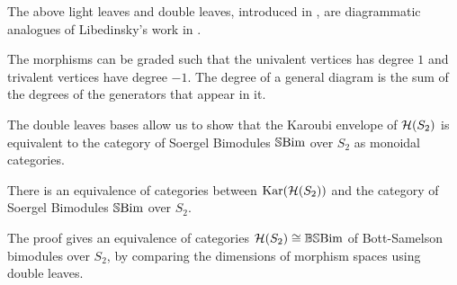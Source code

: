\begin{remark}
    The above light leaves and double leaves, introduced in \cite{elias-williamson-soergel-calculus}, are diagrammatic analogues of Libedinsky's work in \cite{libedinsky-lightleavesbasis}.
\end{remark}

The morphisms can be graded such that the univalent vertices has degree $1$ and trivalent vertices have degree $-1$. The degree of a general diagram is the sum of the degrees of the generators that appear in it. 

The double leaves bases allow us to show that the Karoubi envelope of $\mathcal{H}(S_2)$ is equivalent to the category of Soergel Bimodules $\operatorname{\mathbb{S}Bim}$ over $S_2$ as monoidal categories.

\begin{theorem}
    There is an equivalence of categories between $\operatorname{Kar}(\mathcal{H}(S_2))$ and the category of Soergel Bimodules $\operatorname{\mathbb{S}Bim}$ over $S_2$.
\end{theorem}
The proof gives an equivalence of categories $\mathcal{H}(S_2) \cong \operatorname{\mathbb{BS}Bim}$ of Bott-Samelson bimodules over $S_2$, by comparing the dimensions of morphism spaces using double leaves.

